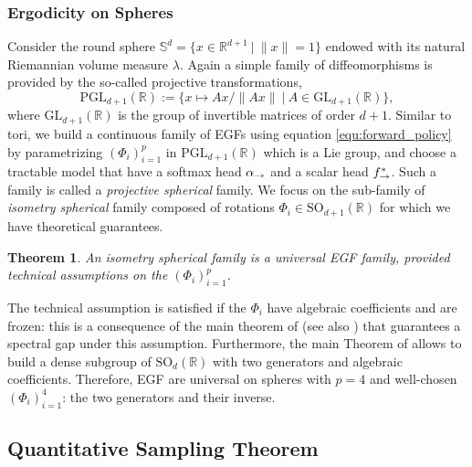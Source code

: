 \documentclass{article}
\theoremstyle{plain}
\newtheorem{theorem}{Theorem}[section]
\theoremstyle{definition}
\theoremstyle{remark}
\theoremstyle{fact}
\begin{document}
\subsubsection{Ergodicity on Spheres}
\label{sec:universality_sphere}
Consider the round sphere $\mathbb S^d=\{x\in \mathbb R^{d+1}~|~ \|x\|=1\}$ endowed with its natural Riemannian volume measure $\lambda$. Again a simple family of diffeomorphisms is provided by the so-called projective transformations, 
\begin{equation}
    \mathrm{PGL}_{d+1}(\mathbb R) := \{x\mapsto Ax/\|Ax\| ~|~ A\in \mathrm{GL}_{d+1}(\mathbb R)\},
\end{equation}
where $\mathrm{GL}_{d+1}(\mathbb{R})$ is the group of invertible matrices of order $d+1$.
Similar to tori, we build a continuous family of EGFs using equation \eqref{equ:forward_policy} by parametrizing $(\Phi_i)_{i=1}^p$ in $\mathrm{PGL}_{d+1}(\mathbb R)$ which is a Lie group, and choose a tractable model that have a softmax head $\alpha_{\rightarrow}$ and a scalar head $f^*_{\rightarrow}$. Such a family is called a {\it projective spherical} family. 
We focus on the sub-family of {\it isometry spherical} family composed of rotations $\Phi_i\in \mathrm{SO}_{d+1}(\mathbb R)$ for which we have theoretical guarantees.

\begin{theorem}\label{theo:universality_sphere} An isometry spherical family is a universal EGF family, provided technical assumptions on the $(\Phi_i)_{i=1}^p$.
\end{theorem}
The technical assumption is satisfied if the $\Phi_i$ have algebraic coefficients and are frozen: this is a consequence of the main theorem of \citet{bourgain2012spectral} (see also \citet{benoist2016spectral}) that guarantees a spectral gap under this assumption. Furthermore, the main Theorem of \citet{breuillard2003dense} allows to build a dense subgroup of $\mathrm{SO}_{d}(\mathbb R)$ with two generators and algebraic coefficients.
Therefore, EGF are universal on spheres with $p=4$ and well-chosen $(\Phi_i)_{i=1}^4$: the two generators and their inverse.

\subsection{Quantitative Sampling Theorem}
\label{sec:theory1}
\end{document}

